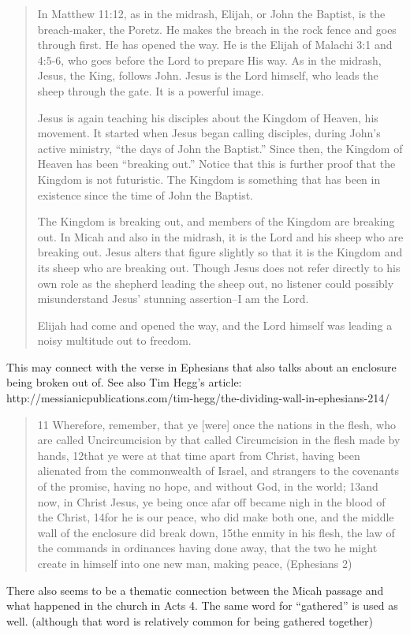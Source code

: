 \documentclass[11pt]{article}
\begin{document}
\begin{quote}
In Matthew 11:12, as in the midrash, Elijah, or John the Baptist, is
the breach-maker, the Poretz. He makes the breach in the rock fence
and goes through first. He has opened the way. He is the Elijah of
Malachi 3:1 and 4:5-6, who goes before the Lord to prepare His way. As
in the midrash, Jesus, the King, follows John. Jesus is the Lord
himself, who leads the sheep through the gate. It is a powerful image.

Jesus is again teaching his disciples about the Kingdom of Heaven,
his movement. It started when Jesus began calling disciples, during
John’s active ministry, “the days of John the Baptist.” Since then,
the Kingdom of Heaven has been “breaking out.” Notice that this is
further proof that the Kingdom is not futuristic. The Kingdom is
something that has been in existence since the time of John the
Baptist.

The Kingdom is breaking out, and members of the Kingdom are breaking
out. In Micah and also in the midrash, it is the Lord and his sheep
who are breaking out. Jesus alters that figure slightly so that it is
the Kingdom and its sheep who are breaking out. Though Jesus does not
refer directly to his own role as the shepherd leading the sheep out,
no listener could possibly misunderstand Jesus’ stunning assertion–I
am the Lord.

Elijah had come and opened the way, and the Lord himself was leading
a noisy multitude out to freedom.
\end{quote}
This may connect with the verse in Ephesians that also talks about an enclosure being broken out of. See also Tim Hegg’s article: http://messianicpublications.com/tim-hegg/the-dividing-wall-in-ephesians-214/
\begin{quote}
11 Wherefore, remember, that ye [were] once the nations in the flesh, who are called Uncircumcision by that called Circumcision in the flesh made by hands, 12that ye were at that time apart from Christ, having been alienated from the commonwealth of Israel, and strangers to the covenants of the promise, having no hope, and without God, in the world; 13and now, in Christ Jesus, ye being once afar off became nigh in the blood of the Christ, 14for he is our peace, who did make both one, and the middle wall of the enclosure did break down, 15the enmity in his flesh, the law of the commands in ordinances having done away, that the two he might create in himself into one new man, making peace, (Ephesians 2)
\end{quote}
There also seems to be a thematic connection between the Micah passage and what happened in the church in Acts 4. The same word for “gathered” is used as well. (although that word is relatively common for being gathered together)
\end{document}
